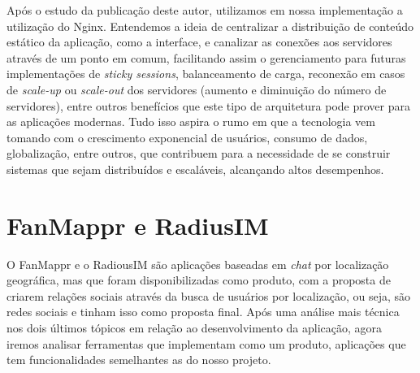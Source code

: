 Após o estudo da publicação deste autor, utilizamos em nossa implementação a utilização do Nginx. Entendemos a ideia de centralizar a distribuição de conteúdo estático da aplicação, como a interface, e canalizar as conexões aos servidores através de um ponto em comum, facilitando assim o gerenciamento para futuras implementações de \textit{sticky sessions}, balanceamento de carga, reconexão em casos de \textit{scale-up} ou \textit{scale-out} dos servidores (aumento e diminuição do número de servidores), entre outros benefícios que este tipo de arquitetura pode prover para as aplicações modernas. Tudo isso aspira o rumo em que a tecnologia vem tomando com o crescimento exponencial de usuários, consumo de dados, globalização, entre outros, que contribuem para a necessidade de se construir sistemas que sejam distribuídos e escaláveis, alcançando altos desempenhos.

\section{FanMappr e RadiusIM}
O FanMappr \cite{fanmappr} e o RadiousIM \cite{radiusim} são aplicações baseadas em \textit{chat} por localização geográfica, mas que foram disponibilizadas como produto, com a proposta de criarem relações sociais através da busca de usuários por localização, ou seja, são redes sociais e tinham isso como proposta final. Após uma análise mais técnica nos dois últimos tópicos em relação ao desenvolvimento da aplicação, agora iremos analisar ferramentas que implementam como um produto, aplicações que tem funcionalidades semelhantes as do nosso projeto.

